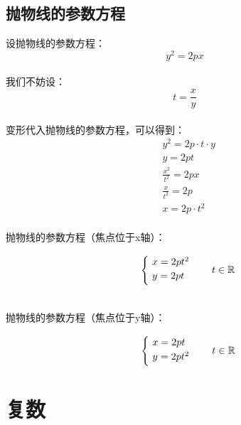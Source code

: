 \documentclass[UTF8]{ctexart}
\begin{document}
\newpage

\subsection{抛物线的参数方程}
    \setcounter{equation}{0}
    设抛物线的参数方程：
    \begin{equation}
        y^2=2px
    \end{equation}\\
    我们不妨设：
    \begin{equation}
        t=\frac{x}{y}
    \end{equation}\\
    变形代入抛物线的参数方程，可以得到：
    \begin{align}
        &y^2=2p\cdot t\cdot y\\[4mm]
        &y=2pt\\[7mm]
        &\frac{x^2}{t^2}=2px\\[4mm]
        &\frac{x}{t^2}=2p\\[4mm]
        &x=2p\cdot t^2
    \end{align}\\
    抛物线的参数方程（焦点位于x轴）：
    \begin{large}
        \begin{equation*}
            ~~~~\begin{cases}
                ~x=2pt^2\\
                ~y=2pt\vspace{3pt}
            \end{cases}\quad t\in\mathbb{R}~~
        \end{equation*}
    \end{large}\\[1mm]
    抛物线的参数方程（焦点位于y轴）：
    \begin{large}
        \begin{equation*}
            ~~~~\begin{cases}
                ~x=2pt\\
                ~y=2pt^2\vspace{3pt}
            \end{cases}\quad t\in\mathbb{R}~~
        \end{equation*}
    \end{large}

\newpage

\section{复数}
\end{document}
